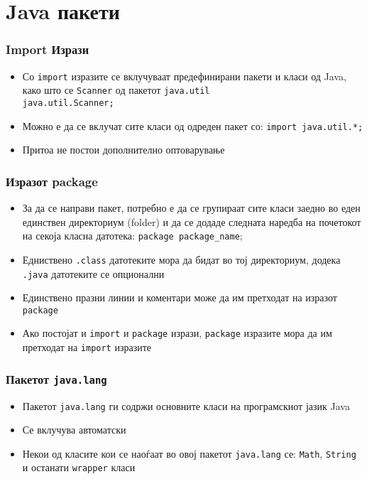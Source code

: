 \section{Java пакети}

\begin{frame}\frametitle{Import Изрази}

\begin{itemize}
\item
  Со \texttt{import} изразите се вклучуваат предефинирани пакети и класи од
  Java, како што се \texttt{Scanner} од пакетот \texttt{java.util} \\
  \texttt{java.util.Scanner;}
\item
  Можно е да се вклучат сите класи од одреден пакет со: \texttt{import java.util.*;}
\item
  Притоа не постои дополнително оптоварување
\end{itemize}
\end{frame}

\begin{frame}\frametitle{Изразот package}

\begin{itemize}
\item
  За да се направи пакет, потребно е да се групираат сите класи заедно во еден
  единствен директориум (folder) и да се додаде следната наредба на почетокот
  на секоја класна датотека: \texttt{package package\_name};
\item
  Едниствено \texttt{.class} датотеките мора да бидат во тој директориум, додека
  \texttt{.java} датотеките се опционални
\item
  Единствено празни линии и коментари може да им претходат на изразот \texttt{package}
\item
  Ако постојат и \texttt{import} и \texttt{package} изрази, \texttt{package}
  изразите мора да им претходат на \texttt{import} изразите
\end{itemize}
\end{frame}

\begin{frame}\frametitle{Пакетот \texttt{java.lang}}

\begin{itemize}
\item
  Пакетот \texttt{java.lang} ги содржи основните класи на програмскиот јазик Java
  \item
    Се вклучува автоматски
  \item
   Некои од класите кои се наоѓаат во овој пакетот \texttt{java.lang} се:
   \texttt{Math}, \texttt{String} и останати \texttt{wrapper} класи
  \end{itemize}
\end{frame}

